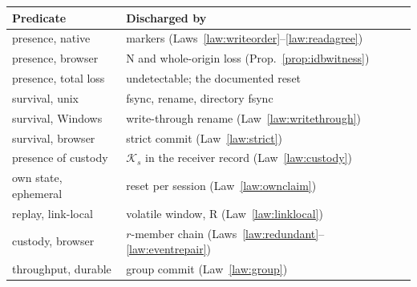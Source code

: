 \documentclass[journal]{IEEEtran}
\newcommand{\K}{\mathcal{K}}
\begin{document}
\begin{center}
\small
\begin{tabular}{@{}ll@{}}
\toprule
Predicate & Discharged by\\
\midrule
presence, native & markers (Laws~\ref{law:writeorder}--\ref{law:readagree})\\
presence, browser & N and whole-origin loss (Prop.~\ref{prop:idbwitness})\\
presence, total loss & undetectable; the documented reset\\
survival, unix & fsync, rename, directory fsync\\
survival, Windows & write-through rename (Law~\ref{law:writethrough})\\
survival, browser & strict commit (Law~\ref{law:strict})\\
presence of custody & $\K_s$ in the receiver record (Law~\ref{law:custody})\\
own state, ephemeral & reset per session (Law~\ref{law:ownclaim})\\
replay, link-local & volatile window, R (Law~\ref{law:linklocal})\\
custody, browser & $r$-member chain (Laws~\ref{law:redundant}--\ref{law:eventrepair})\\
throughput, durable & group commit (Law~\ref{law:group})\\
\bottomrule
\end{tabular}
\end{center}

\sloppy


\end{document}
